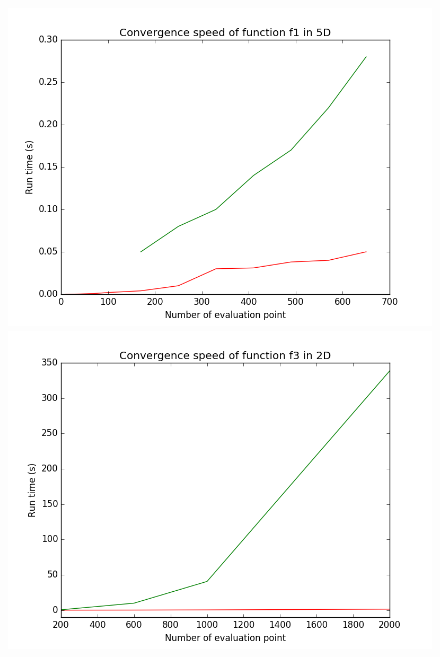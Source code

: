 \begin{figure}[h]
   \begin{minipage}[b]{0.32\linewidth}
      \centering \includegraphics[scale=0.3]{images/f1_5d_s.png}
   \end{minipage}
   \begin{minipage}[b]{0.32\linewidth}
      \centering \includegraphics[scale=0.3]{images/f3_2d_s.png}
   \end{minipage}
   \begin{minipage}[b]{0.32\linewidth}

\end{minipage}
\end{figure}

